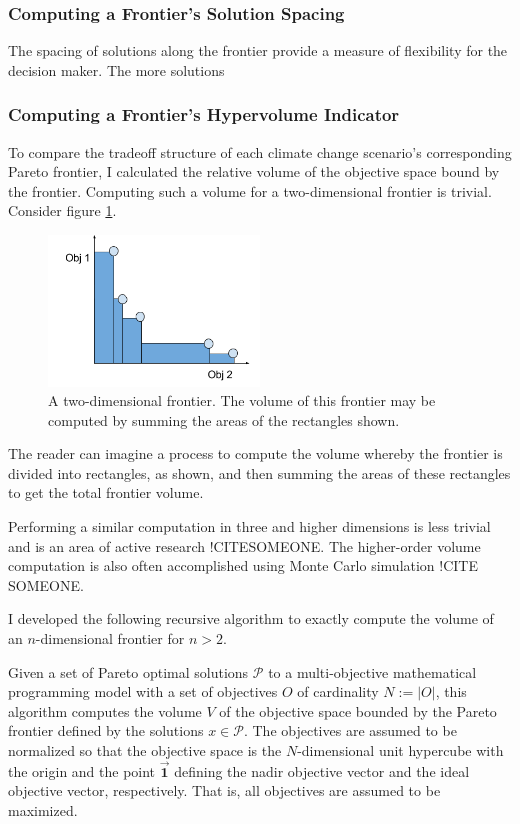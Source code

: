 \subsubsection{Computing a Frontier's Solution Spacing}
The spacing of solutions along the frontier provide a measure of flexibility for the decision maker. The more solutions 

\subsubsection{Computing a Frontier's Hypervolume Indicator}
To compare the tradeoff structure of each climate change scenario's corresponding Pareto frontier, I calculated the relative volume of the objective space bound by the frontier.  Computing such a volume for a two-dimensional frontier is trivial. Consider figure \ref{fig:2DFrontierVol}.
\begin{figure}[h]
  \centering
    \includegraphics[width=0.5\textwidth]{"../images/2DFrontierVolumeExample"}
  \caption{A two-dimensional frontier. The volume of this frontier may be computed by summing the areas of the rectangles shown.}
  \label{fig:2DFrontierVol}
\end{figure}
The reader can imagine a process to compute the volume whereby the frontier is divided into rectangles, as shown, and then summing the areas of these rectangles to get the total frontier volume.

Performing a similar computation in three and higher dimensions is less trivial and is an area of active research !CITESOMEONE. The higher-order volume computation is also often accomplished using Monte Carlo simulation !CITE SOMEONE.

I developed the following recursive algorithm to exactly compute the volume of an $n$-dimensional frontier for $n>2$.

Given a set of Pareto optimal solutions $\mathcal{P}$ to a multi-objective mathematical programming model with a set of objectives $O$ of cardinality $N := |O|$, this algorithm computes the volume $V$ of the objective space bounded by the Pareto frontier defined by the solutions $x \in \mathcal{P}$. The objectives are assumed to be normalized so that the objective space is the $N$-dimensional unit hypercube with the origin and the point $\vec{\mathbf{1}}$ defining the nadir objective vector and the ideal objective vector, respectively. That is, all objectives are assumed to be maximized.


